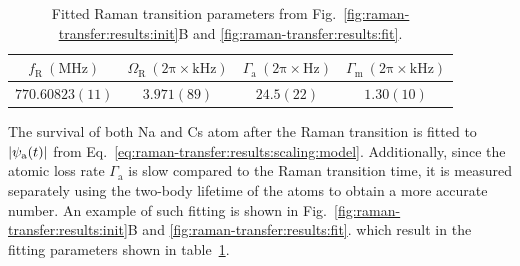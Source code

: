 \begin{table}
  \centering
  \caption[Raman transition parameters.]{
    Fitted Raman transition parameters from Fig.~\ref{fig:raman-transfer:results:init}B
    and \ref{fig:raman-transfer:results:fit}.
    \label{table:raman-transfer:results:fit}}
  \begin{tabular}{|c|c|c|c|}
    \hline
    $f_{\mathrm{R}}~(\mathrm{MHz})$&$\Omega_{\mathrm{R}}~(\mathrm{2\pi\times kHz})$
    &$\Gamma_{\mathrm{a}}~(\mathrm{2\pi\times Hz})$
    &$\Gamma_{\mathrm{m}}~(\mathrm{2\pi\times kHz})$\\\hline
    $770.60823(11)$&$3.971(89)$&$24.5(22)$&$1.30(10)$\\\hline
  \end{tabular}
\end{table}
The survival of both Na and Cs atom after the Raman transition
is fitted to ${\left|{\psi_{\mathrm{a}}(t)}\right|}$ from Eq.~\ref{eq:raman-transfer:results:scaling:model}.
Additionally, since the atomic loss rate $\Gamma_{\mathrm{a}}$
is slow compared to the Raman transition time,
it is measured separately using the two-body lifetime of the atoms
to obtain a more accurate number.
An example of such fitting is shown in Fig.~\ref{fig:raman-transfer:results:init}B
and \ref{fig:raman-transfer:results:fit}.
which result in the fitting parameters shown in table~\ref{table:raman-transfer:results:fit}.

